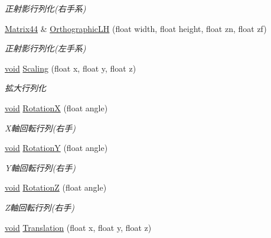 \begin{DoxyCompactItemize}
\begin{DoxyCompactList}\small\item\em 正射影行列化(右手系) \end{DoxyCompactList}\item 
\mbox{\hyperlink{struct_effekseer_1_1_matrix44}{Matrix44}} \& \mbox{\hyperlink{struct_effekseer_1_1_matrix44_a8b53aee4d2c1598cbdd64ab6a6364af2}{Orthographic\+LH}} (float width, float height, float zn, float zf)
\begin{DoxyCompactList}\small\item\em 正射影行列化(左手系) \end{DoxyCompactList}\item 
\mbox{\hyperlink{namespace_effekseer_ab34c4088e512200cf4c2716f168deb56}{void}} \mbox{\hyperlink{struct_effekseer_1_1_matrix44_a973c274dff2d56d5f6b8453971ffe0ba}{Scaling}} (float x, float y, float z)
\begin{DoxyCompactList}\small\item\em 拡大行列化 \end{DoxyCompactList}\item 
\mbox{\hyperlink{namespace_effekseer_ab34c4088e512200cf4c2716f168deb56}{void}} \mbox{\hyperlink{struct_effekseer_1_1_matrix44_a79af751b490a7107a767d85f87d9faf7}{RotationX}} (float angle)
\begin{DoxyCompactList}\small\item\em X軸回転行列(右手) \end{DoxyCompactList}\item 
\mbox{\hyperlink{namespace_effekseer_ab34c4088e512200cf4c2716f168deb56}{void}} \mbox{\hyperlink{struct_effekseer_1_1_matrix44_a0c8f82d6551b691579d53278164806da}{RotationY}} (float angle)
\begin{DoxyCompactList}\small\item\em Y軸回転行列(右手) \end{DoxyCompactList}\item 
\mbox{\hyperlink{namespace_effekseer_ab34c4088e512200cf4c2716f168deb56}{void}} \mbox{\hyperlink{struct_effekseer_1_1_matrix44_a07b2387e64cdcf9227ca954a48d60e9f}{RotationZ}} (float angle)
\begin{DoxyCompactList}\small\item\em Z軸回転行列(右手) \end{DoxyCompactList}\item 
\mbox{\hyperlink{namespace_effekseer_ab34c4088e512200cf4c2716f168deb56}{void}} \mbox{\hyperlink{struct_effekseer_1_1_matrix44_af10dc0777b15b329cb33e173ce86924b}{Translation}} (float x, float y, float z)

\end{DoxyCompactItemize}
